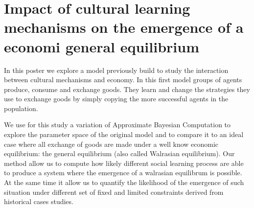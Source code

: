 \documentclass[a4paper,10pt]{report}
\begin{document}
\section*{Impact of cultural learning mechanisms on the emergence of a economi general equilibrium}

In this poster we explore a model previously build to study the interaction between cultural mechanisms and economy. In this first model groups of agents produce, consume and exchange goods. They learn and change the strategies they use to exchange goods by simply copying the more successful agents in the population.

We use for this study a variation of Approximate Bayesian Computation to explore the parameter space of the original model and to compare it to an ideal case where all exchange of goods are made under a well know economic equilibrium: the  general equilibrium (also called Walrasian equilibrium). Our method allow us to compute how likely different social learning process are able to produce a system where the emergence of a walrasian equilibrum is possible. At the same time it allow us to quantify the likelihood of the emergence of such situation under different set of fixed and limited constraints derived from historical cases studies.
\end{document}
